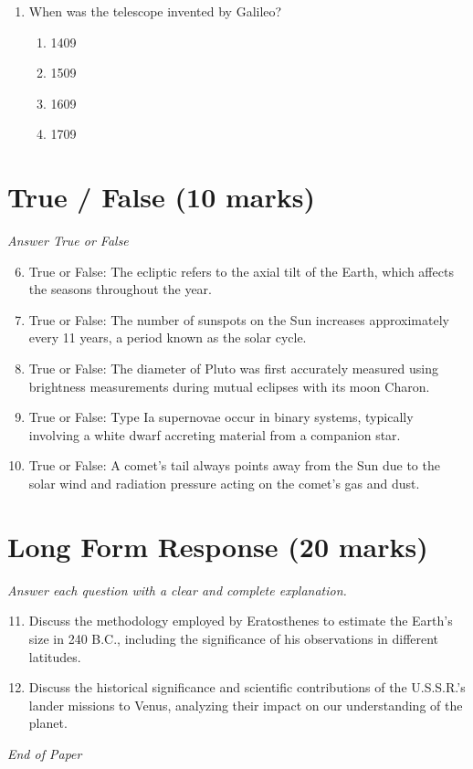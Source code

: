 \documentclass[12pt]{article}
\begin{document}
\begin{enumerate}[label=\arabic*.]
\begin{enumerate}[label=(\alph*)]
    \item 9.3 x 1013 meters
    \item 9.3 x 1010 meters
    \item 1.5 x 1014 meters
    \item 1.5 x 1017 meters
\end{enumerate}
\item When was the telescope invented by Galileo?
\begin{enumerate}[label=(\alph*)]
    \item 1409
    \item 1509
    \item 1609
    \item 1709
\end{enumerate}
\end{enumerate}

\section*{True / False (10 marks)}
\textit{Answer True or False}
\begin{enumerate}[label=\arabic*.]
\setcounter{enumi}{5}
\item True or False: The ecliptic refers to the axial tilt of the Earth, which affects the seasons throughout the year.
\item True or False: The number of sunspots on the Sun increases approximately every 11 years, a period known as the solar cycle.
\item True or False: The diameter of Pluto was first accurately measured using brightness measurements during mutual eclipses with its moon Charon.
\item True or False: Type Ia supernovae occur in binary systems, typically involving a white dwarf accreting material from a companion star.
\item True or False: A comet's tail always points away from the Sun due to the solar wind and radiation pressure acting on the comet's gas and dust.
\end{enumerate}

\section*{Long Form Response (20 marks)}
\textit{Answer each question with a clear and complete explanation.}
\begin{enumerate}[label=\arabic*.]
\setcounter{enumi}{10}
\item Discuss the methodology employed by Eratosthenes to estimate the Earth's size in 240 B.C.,
including the significance of his observations in different latitudes.
\item Discuss the historical significance and scientific contributions of the U.S.S.R.'s lander
missions to Venus, analyzing their impact on our understanding of the planet.
\end{enumerate}

\vfill
\noindent\textit{End of Paper}
\end{document}
